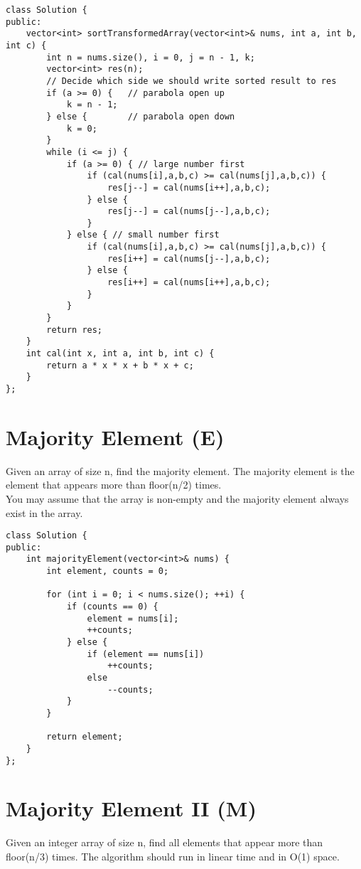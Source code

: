 \begin{lstlisting}
class Solution {
public:
    vector<int> sortTransformedArray(vector<int>& nums, int a, int b, int c) {
        int n = nums.size(), i = 0, j = n - 1, k;
        vector<int> res(n);
        // Decide which side we should write sorted result to res
        if (a >= 0) {   // parabola open up
            k = n - 1;
        } else {        // parabola open down
            k = 0;
        }
        while (i <= j) {
            if (a >= 0) { // large number first
                if (cal(nums[i],a,b,c) >= cal(nums[j],a,b,c)) {
                    res[j--] = cal(nums[i++],a,b,c);
                } else {
                    res[j--] = cal(nums[j--],a,b,c);
                }
            } else { // small number first
                if (cal(nums[i],a,b,c) >= cal(nums[j],a,b,c)) {
                    res[i++] = cal(nums[j--],a,b,c);
                } else {
                    res[i++] = cal(nums[i++],a,b,c);
                }
            }
        }
        return res;
    }
    int cal(int x, int a, int b, int c) {
        return a * x * x + b * x + c;
    }
};
\end{lstlisting}


\section{Majority Element (E)}
Given an array of size n, find the majority element. The majority element is the element that appears more than floor(n/2) times.\\

You may assume that the array is non-empty and the majority element always exist in the array.\\

\begin{lstlisting}
class Solution {
public:
    int majorityElement(vector<int>& nums) {
        int element, counts = 0;
        
        for (int i = 0; i < nums.size(); ++i) {
            if (counts == 0) {
                element = nums[i];
                ++counts;
            } else {
                if (element == nums[i])
                    ++counts;
                else
                    --counts;
            }
        }
        
        return element;
    }
};
\end{lstlisting}


\section{Majority Element II (M)}
Given an integer array of size n, find all elements that appear more than floor(n/3) times. The algorithm should run in linear time and in O(1) space. \\

